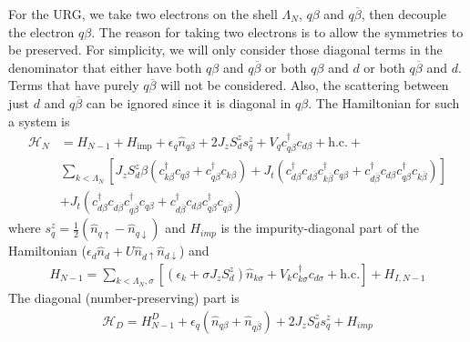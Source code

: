 \documentclass[twoside,11pt]{report}
\numberwithin{equation}{section}
\begin{document}
For the URG, we take two electrons on the shell \(\Lambda_N\), \(q\beta\) and \(q\overline\beta\), then decouple the electron \(q\beta\). The reason for taking two electrons is to allow the symmetries to be preserved. For simplicity, we will only consider those diagonal terms in the denominator that either have both \(q\beta\) and \(q\overline\beta\) or  both \(q\beta\) and \(d\) or both \(q\overline\beta\) and \(d\). Terms that have purely \(q\overline\beta\) will not be considered. Also, the scattering between just \(d\) and \(q\overline\beta\) can be ignored since it is diagonal in \(q\beta\). The Hamiltonian for such a system is
\begin{equation}\begin{aligned}
\mathcal{H}_N &= H_{N-1} + H_\text{imp} + \epsilon_q\hat n_{q\beta} + 2J_z S^z_d s^z_q + V_q c^\dagger_{q\beta}c_{d\beta} + \text{h.c.} +\\
	      & \sum_{k<\Lambda_N}\left[J_z S^z_d \beta \left(c^\dagger_{k\beta}c_{q\beta} + c^\dagger_{q\beta}c_{k\beta}\right) + J_t \left(c^\dagger_{d\beta}c_{d\overline\beta}c^\dagger_{k\overline\beta}c_{q \beta} + c^\dagger_{d\overline\beta}c_{d\beta}c^\dagger_{q\beta}c_{k\overline\beta}\right)\right]\\
	      & + J_t \left(c^\dagger_{d\beta}c_{d\overline\beta}c^\dagger_{q\overline\beta}c_{q \beta} + c^\dagger_{d\overline\beta}c_{d\beta}c^\dagger_{q\beta}c_{q\overline\beta}\right)
\end{aligned}\end{equation}
where \(s_q^z = \frac{1}{2}\left(\hat n_{q\uparrow} - \hat n_{q\downarrow}\right)\) and \(H_{imp}\) is the impurity-diagonal part of the Hamiltonian (\(\epsilon_d \hat n_d + U\hat n_{d\uparrow}\hat n_{d\downarrow}\)) and 
\begin{equation}\begin{aligned}
	H_{N-1} = \sum_{k<\Lambda_N,\sigma}\left[\left(\epsilon_k +  \sigma J_z S^z_d\right)\hat n_{k\sigma} + V_k c^\dagger_{k\sigma}c_{d\sigma} + \text{h.c.}\right] + H_{I,N-1}
\end{aligned}\end{equation}
The diagonal (number-preserving) part is
\begin{equation}\begin{aligned}
	\mathcal{H}_D = H^D_{N-1} + \epsilon_q\left(\hat n_{q\beta} + \hat n_{q\overline\beta}\right) + 2J_z S^z_ds^z_{q} + H_{imp}\\
\end{aligned}\end{equation}
\end{document}
